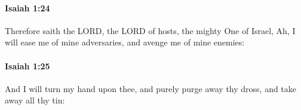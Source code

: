 		\paragraph{Isaiah 1:24} %
			\label{ISAIAH-1-24}

			Therefore saith the LORD, the LORD of hosts, the mighty One of Israel, Ah, I will ease me of mine adversaries, and avenge me of mine enemies:


		\paragraph{Isaiah 1:25} %
			\label{ISAIAH-1-25}

			And I will turn my hand upon thee, and purely purge away thy dross, and take away all thy tin:


